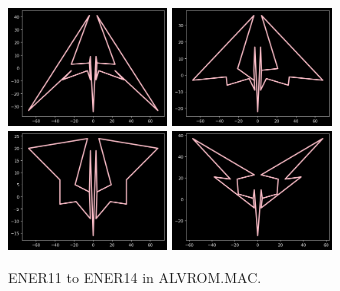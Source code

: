 \begin{figure}[H]
  \centering
        \includegraphics[width=4.22cm]{src/tempest_unused/ENER11.png}%
        \hspace{0.2cm}
        \includegraphics[width=4.22cm]{src/tempest_unused/ENER12.png}%
        \hspace{0.2cm}
        \includegraphics[width=4.22cm]{src/tempest_unused/ENER13.png}%
        \hspace{0.2cm}
        \includegraphics[width=4.22cm]{src/tempest_unused/ENER14.png}%
  \caption*{ENER11 to ENER14 in ALVROM.MAC.}
\end{figure}
